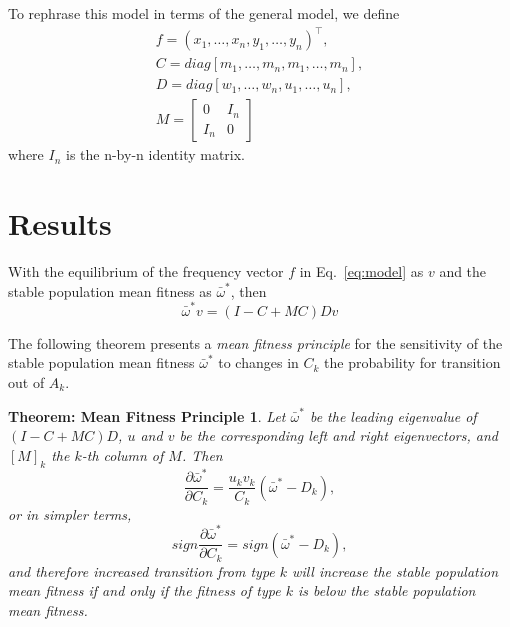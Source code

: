 \documentclass[9pt, a4paper, twocolumn]{extarticle}
\newcommand*{\tr}{^\intercal}
\newtheorem*{mfp}{Theorem: Mean Fitness Principle}
\begin{document}
To rephrase this model in terms of the general model, we define
\begin{equation}
\begin{aligned}
f = (x_1, \ldots, x_n, y_1, \ldots, y_n)\tr, \\
C = diag[m_1, \ldots, m_n, m_1, \ldots, m_n], \\
D = diag[w_1, \ldots, w_n, u_1, \ldots, u_n], \\
M = \begin{bmatrix}
0 & I_n \\
I_n & 0
\end{bmatrix}
\end{aligned}
\end{equation}
where $I_n$ is the n-by-n identity matrix.

\section*{Results}

With the equilibrium of the frequency vector $f$ in Eq.~\ref{eq:model} as $v$ and the stable population mean fitness as $\bar{\omega}^*$, then
\begin{equation}\label{eq:model_equilibrium}
\bar{\omega}^* v = (I-C+MC)D v
\end{equation}

The following theorem presents a \emph{mean fitness principle} for the
sensitivity of the stable population mean fitness $\bar{\omega}^*$ to changes
in $C_k$ the probability for transition out of $A_k$.

\begin{mfp}
Let $\bar{\omega}^*$ be the leading eigenvalue of $(I-C+MC)D$, $u$ and $v$ be the corresponding left and right eigenvectors, and $[M]_k$ the $k$-th column of $M$. Then
\begin{equation}\label{eq:theorem}
\frac{\partial \bar{\omega}^*}{\partial C_k} = 
\frac{u_k v_k}{C_k} (\bar{\omega}^* - D_k),
\end{equation}
or in simpler terms,
\begin{equation}\label{eq:sign_theorem}
sign\frac{\partial \bar{\omega}^*}{\partial C_k} = 
sign(\bar{\omega}^* - D_k), 
\end{equation}
and therefore increased transition from type $k$ will increase the stable population mean fitness if and only if the fitness of type $k$ is below the stable population mean fitness.
\end{mfp}
\end{document}
